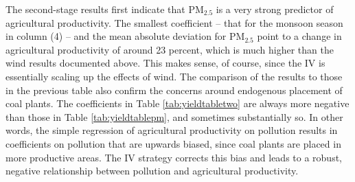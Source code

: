 \documentclass[
]{article}
\begin{document}
The second-stage results first indicate that \(\mathrm{PM_{2.5}}\) is a very strong predictor of agricultural productivity. The smallest coefficient -- that for the monsoon season in column (4) -- and the mean absolute deviation for \(\mathrm{PM_{2.5}}\) point to a change in agricultural productivity of around 23 percent, which is much higher than the wind results documented above. This makes sense, of course, since the IV is essentially scaling up the effects of wind. The comparison of the results to those in the previous table also confirm the concerns around endogenous placement of coal plants. The coefficients in Table \ref{tab:yieldtabletwo} are always more negative than those in Table \ref{tab:yieldtablepm}, and sometimes substantially so. In other words, the simple regression of agricultural productivity on pollution results in coefficients on pollution that are upwards biased, since coal plants are placed in more productive areas. The IV strategy corrects this bias and leads to a robust, negative relationship between pollution and agricultural productivity.
\end{document}
